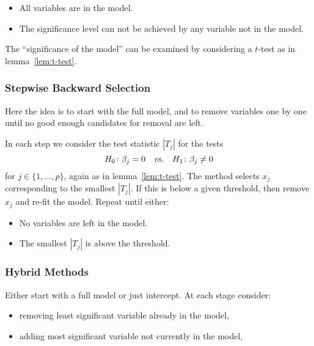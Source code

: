\documentclass[
  a4paper,
]{article}
\providecommand{\tightlist}{%
  \setlength{\itemsep}{0pt}\setlength{\parskip}{0pt}}
\theoremstyle{definition}
\theoremstyle{definition}
\theoremstyle{definition}
\theoremstyle{definition}
\theoremstyle{remark}
\begin{document}
\begin{itemize}
\tightlist
\item
  All variables are in the model.
\item
  The significance level can not be achieved by any variable not in the model.
\end{itemize}

The ``significance of the model'' can be examined by considering a
\(t\)-test as in lemma~\ref{lem:t-test}.

\hypertarget{stepwise-backward-selection}{%
\subsubsection{Stepwise Backward Selection}\label{stepwise-backward-selection}}

Here the idea is to start with the full model, and to remove variables
one by one until no good enough candidates for removal are left.

In each step we consider the test statistic \(|T_j|\) for the tests
\begin{equation*}
  H_0\colon \beta_j = 0
  \quad\mbox{\textit{vs.}}\quad
  H_1\colon \beta_j \neq 0
\end{equation*}
for \(j \in \{1, \ldots, p\}\), again as in lemma~\ref{lem:t-test}.
The method selects \(x_j\) corresponding to the smallest \(|T_j|\).
If this is below a given threshold, then remove \(x_j\) and re-fit the model.
Repeat until either:

\begin{itemize}
\tightlist
\item
  No variables are left in the model.
\item
  The smallest \(|T_j|\) is above the threshold.
\end{itemize}

\hypertarget{hybrid-methods}{%
\subsubsection{Hybrid Methods}\label{hybrid-methods}}

Either start with a full model or just intercept. At each stage consider:

\begin{itemize}
\tightlist
\item
  removing least significant variable already in the model,
\item
  adding most significant variable not currently in the model,
\end{itemize}
\end{document}
